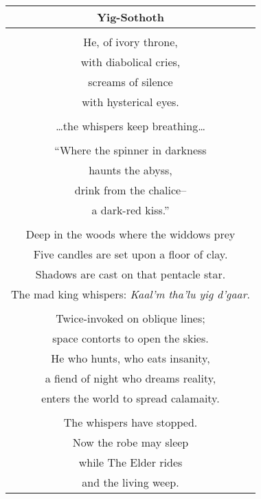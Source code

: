 \documentclass{article}
\begin{document}
\begin{center}
\begin{tabular}{c}
\textbf{Yig-Sothoth} \\ \hline
\\
He, of ivory throne, \\
with diabolical cries, \\
screams of silence \\
with hysterical eyes. \\
\\
\ldots{}the whispers keep breathing\ldots{} \\
\\
``Where the spinner in darkness \\
haunts the abyss, \\
drink from the chalice-- \\
a dark-red kiss.'' \\
\\
Deep in the woods where the widdows prey \\
Five candles are set upon a floor of clay. \\
Shadows are cast on that pentacle star. \\
The mad king whispers: \textit{Kaal'm tha'lu yig d'gaar}. \\
\\
Twice-invoked on oblique lines; \\
space contorts to open the skies. \\
He who hunts, who eats insanity, \\
a fiend of night who dreams reality, \\
enters the world to spread calamaity. \\
\\
The whispers have stopped. \\
Now the robe may sleep \\
while The Elder rides \\
and the living weep. \\
\end{tabular}
\end{center}
\end{document}
